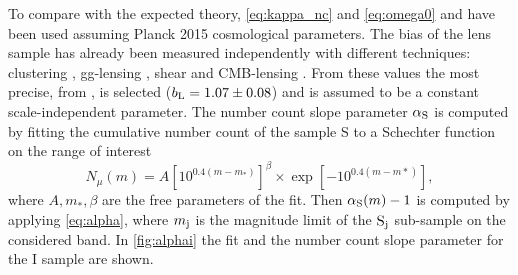 To compare with the expected theory, \autoref{eq:kappa_nc} and \autoref{eq:omega0} and  have been used assuming Planck 2015 \cite{2016A&A...594A..13P} cosmological parameters. The bias of the lens sample has already been measured independently with different techniques: clustering \cite{2016MNRAS.455.4301C}, gg-lensing \cite{2016arXiv160908167P}, shear \cite{2016MNRAS.459.3203C} and CMB-lensing \cite{2016MNRAS.456.3213G}. From these values the most precise, from \cite{2016MNRAS.455.4301C}, is selected ($b_{\rm L}=1.07\pm0.08$) and is assumed to be a constant scale-independent parameter. The number count slope parameter $\alpha_{\rm S}$ is computed by fitting the cumulative number count of the sample S to a Schechter function \cite{1976ApJ...203..297S} on the range of interest
\begin{equation}
N_\mu(m) = A\left[10^{0.4(m-m_*)}\right]^\beta\times\exp\left[-10^{0.4(m-m*)}\right],
\label{eq:sch}
\end{equation}
where $A,m_*,\beta$ are the free parameters of the fit. Then $\alpha_{\rm S}(m)-1$ is computed by applying \autoref{eq:alpha}, where $m_{\rm j}$ is the magnitude limit of the $\rm S_j$ sub-sample on the considered band. In \autoref{fig:alphai} the fit and the number count slope parameter for the I sample are shown.
